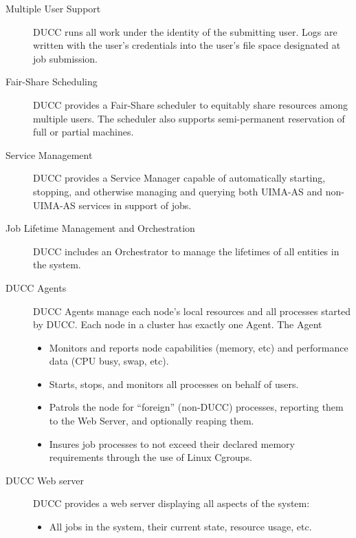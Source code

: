     \begin{description}
        \item[Multiple User Support] DUCC runs all work under the identity of the submitting user. Logs
          are written with the user's credentials into the user's file space designated at job
          submission.

        \item[Fair-Share Scheduling] DUCC provides a Fair-Share scheduler to equitably share
          resources among multiple users.  The scheduler also supports semi-permanent reservation of
          full or partial machines.

        \item[Service Management] DUCC provides a Service Manager capable of automatically starting, stopping, and
          otherwise managing and querying both UIMA-AS and non-UIMA-AS services in support of jobs.

        \item[Job Lifetime Management and Orchestration] DUCC includes an Orchestrator to manage the
          lifetimes of all entities in the system.
          
        \item[DUCC Agents] DUCC Agents manage each node's local resources and all
          processes started by DUCC. Each node in a cluster has exactly one Agent. The Agent
          \begin{itemize}
            \item Monitors and reports node capabilities (memory, etc) and performance data (CPU busy,
              swap, etc).
            \item Starts, stops, and monitors all processes on behalf of users.
            \item Patrols the node for ``foreign'' (non-DUCC) processes, reporting them to the
              Web Server, and optionally reaping them.
            \item Insures job processes to not exceed their declared memory requirements
              through the use of Linux Cgroups.
          \end{itemize}

        \item[DUCC Web server] DUCC  provides a web server displaying all aspects of the system:
          \begin{itemize}
              \item All jobs in the system, their current state, resource usage, etc.
                

\end{itemize}
\end{description}
